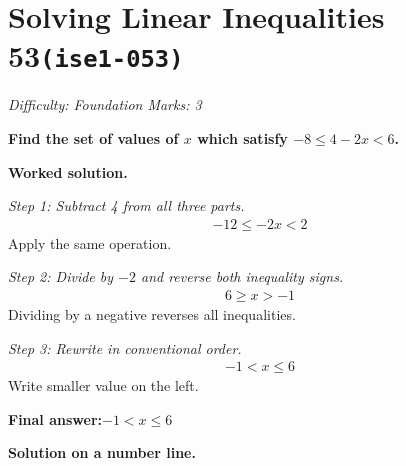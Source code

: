 \documentclass[11pt]{article}
\newcommand{\question}[1]{\par\medskip\noindent\textbf{#1}\par}
\begin{document}
\section*{Solving Linear Inequalities 53\quad\small\texttt{(ise1-053)}}
\textit{Difficulty: Foundation \quad\textbar\quad Marks: 3}

\question{Find the set of values of \( x \) which satisfy \( -8 \leq 4 - 2x < 6 \).}

\textbf{Worked solution.}

\textit{Step 1: Subtract 4 from all three parts.}
\[\begin{gathered}
-12 \leq -2x < 2
\end{gathered}\]
Apply the same operation.

\textit{Step 2: Divide by \( -2 \) and reverse both inequality signs.}
\[\begin{gathered}
6 \geq x > -1
\end{gathered}\]
Dividing by a negative reverses all inequalities.

\textit{Step 3: Rewrite in conventional order.}
\[\begin{gathered}
-1 < x \leq 6
\end{gathered}\]
Write smaller value on the left.

\begin{answerbox}
\textbf{Final answer:}\quad \(\displaystyle  -1 < x \leq 6 \)
\end{answerbox}
\textbf{Solution on a number line.}
\end{document}
